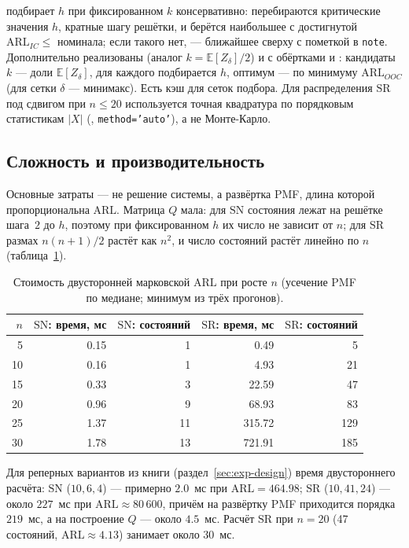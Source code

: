 \documentclass[11pt,a4paper]{article}
\newcommand{\SN}{\mathrm{SN}}
\newcommand{\SR}{\mathrm{SR}}
\newcommand{\ARL}{\mathrm{ARL}}
\newcommand{\E}{\mathbb{E}}
\begin{document}
 подбирает $h$ при фиксированном $k$ консервативно:
перебираются критические значения $h$, кратные шагу решётки, и берётся
наибольшее с достигнутой $\ARL_{IC}\le$ номинала; если такого нет, ---
ближайшее сверху с пометкой в \texttt{note}. Дополнительно реализованы
 (аналог $k=\E[Z_\delta]/2$) и  с
обёртками  и :
кандидаты $k$ --- доли $\E[Z_\delta]$, для каждого подбирается $h$,
оптимум --- по минимуму $\ARL_{OOC}$ (для сетки $\delta$ --- минимакс).
Есть кэш  для сеток подбора. Для распределения $\SR$
под сдвигом при $n\le20$ используется точная квадратура по порядковым
статистикам $|X|$ (,
\texttt{method='auto'}), а не Монте-Карло.

\subsection{Сложность и производительность}
\label{sec:impl-perf}

Основные затраты --- не решение системы, а развёртка PMF, длина которой
пропорциональна $\ARL$. Матрица $Q$ мала: для $\SN$ состояния лежат на
решётке шага~$2$ до $h$, поэтому при фиксированном $h$ их число не зависит
от $n$; для $\SR$ размах $n(n+1)/2$ растёт как $n^2$, и число состояний
растёт линейно по $n$ (таблица~\ref{tab:perf}).

\begin{table}[htbp]\centering
\caption{Стоимость двусторонней марковской $\ARL$ при росте $n$
(усечение PMF по медиане; минимум из трёх прогонов).}
\label{tab:perf}
\small
\begin{tabular}{@{}r r r r r@{}}
\toprule
$n$ & $\SN$: время, мс & $\SN$: состояний & $\SR$: время, мс & $\SR$: состояний \\
\midrule
5  & 0.15 & 1  & 0.49   & 5 \\
10 & 0.16 & 1  & 4.93   & 21 \\
15 & 0.33 & 3  & 22.59  & 47 \\
20 & 0.96 & 9  & 68.93  & 83 \\
25 & 1.37 & 11 & 315.72 & 129 \\
30 & 1.78 & 13 & 721.91 & 185 \\
\bottomrule
\end{tabular}
\normalsize
\end{table}

\noindent
Для реперных вариантов из книги (раздел~\ref{sec:exp-design}) время двустороннего
расчёта: $\SN$ ($10,6,4$) --- примерно $2.0$~мс при $\ARL=464.98$;
$\SR$ ($10,41,24$) --- около $227$~мс при $\ARL\approx 80\,600$, причём
на развёртку PMF приходится порядка $219$~мс, а на построение $Q$ ---
около $4.5$~мс. Расчёт $\SR$ при $n=20$ (47 состояний, $\ARL\approx4.13$)
занимает около $30$~мс.
\end{document}
